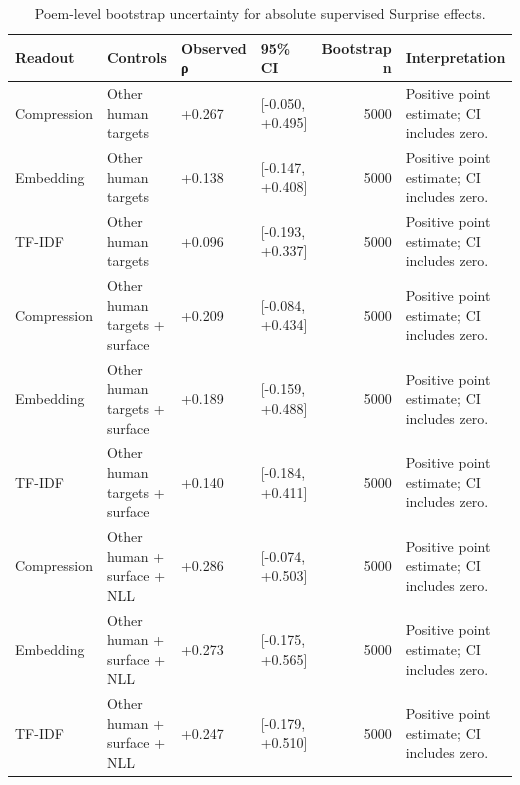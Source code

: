 \begin{table}
\caption{Poem-level bootstrap uncertainty for absolute supervised Surprise effects.}
\label{tab:table_5_absolute_effect_uncertainty}
\begin{tabular}{llllrl}
\toprule
Readout & Controls & Observed ρ & 95\% CI & Bootstrap n & Interpretation \\
\midrule
Compression & Other human targets & +0.267 & [-0.050, +0.495] & 5000 & Positive point estimate; CI includes zero. \\
Embedding & Other human targets & +0.138 & [-0.147, +0.408] & 5000 & Positive point estimate; CI includes zero. \\
TF-IDF & Other human targets & +0.096 & [-0.193, +0.337] & 5000 & Positive point estimate; CI includes zero. \\
Compression & Other human targets + surface & +0.209 & [-0.084, +0.434] & 5000 & Positive point estimate; CI includes zero. \\
Embedding & Other human targets + surface & +0.189 & [-0.159, +0.488] & 5000 & Positive point estimate; CI includes zero. \\
TF-IDF & Other human targets + surface & +0.140 & [-0.184, +0.411] & 5000 & Positive point estimate; CI includes zero. \\
Compression & Other human + surface + NLL & +0.286 & [-0.074, +0.503] & 5000 & Positive point estimate; CI includes zero. \\
Embedding & Other human + surface + NLL & +0.273 & [-0.175, +0.565] & 5000 & Positive point estimate; CI includes zero. \\
TF-IDF & Other human + surface + NLL & +0.247 & [-0.179, +0.510] & 5000 & Positive point estimate; CI includes zero. \\
\bottomrule
\end{tabular}
\end{table}
